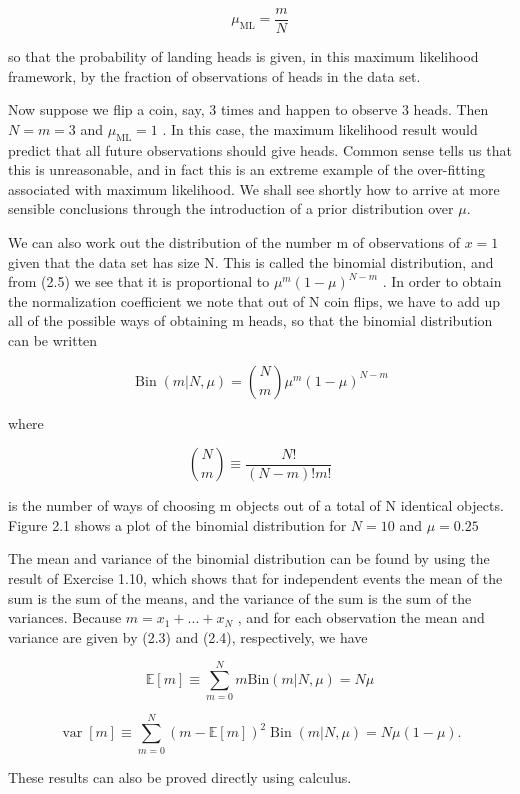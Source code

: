 \documentclass[
  10
]{article}
\begin{document}
\[
\mu_ {\mathrm{ML}} = \frac {m}{N}\tag{2.8}
\]

so that the probability of landing heads is given, in this maximum
likelihood framework, by the fraction of observations of heads in the
data set.

Now suppose we flip a coin, say, 3 times and happen to observe 3 heads.
Then \(N = m = 3\) and \(\mu _ { \mathrm { M L } } = 1\) . In this case,
the maximum likelihood result would predict that all future observations
should give heads. Common sense tells us that this is unreasonable, and
in fact this is an extreme example of the over-fitting associated with
maximum likelihood. We shall see shortly how to arrive at more sensible
conclusions through the introduction of a prior distribution over
\(\mu .\)

We can also work out the distribution of the number m of observations of
\(x = 1\) given that the data set has size N. This is called the
binomial distribution, and from (2.5) we see that it is proportional to
\(\mu ^ { m } ( 1 - \mu ) ^ { N - m }\) . In order to obtain the
normalization coefficient we note that out of N coin flips, we have to
add up all of the possible ways of obtaining m heads, so that the
binomial distribution can be written

\[
\operatorname{Bin} (m | N, \mu) = \binom {N} {m} \mu^ {m} (1 - \mu) ^ {N - m}\tag{2.9}
\]

where

\[
\binom {N} {m} \equiv \frac {N !}{(N - m) ! m !}\tag{2.10}
\]

is the number of ways of choosing m objects out of a total of N
identical objects. Figure 2.1 shows a plot of the binomial distribution
for \(N = 1 0\) and \(\mu = 0 . 2 5\)

The mean and variance of the binomial distribution can be found by using
the result of Exercise 1.10, which shows that for independent events the
mean of the sum is the sum of the means, and the variance of the sum is
the sum of the variances. Because \(m = x _ { 1 } + . . . + x _ { N }\)
, and for each observation the mean and variance are given by (2.3) and
(2.4), respectively, we have

\[
\mathbb {E} [ m ] \equiv \sum_ {m = 0} ^ {N} m \mathrm{Bin} (m | N, \mu) = N \mu\tag{2.11}
\]

\[
\operatorname{var} [ m ] \equiv \sum_ {m = 0} ^ {N} (m - \mathbb {E} [ m ]) ^ {2} \operatorname{Bin} (m | N, \mu) = N \mu (1 - \mu).\tag{2.12}
\]

These results can also be proved directly using calculus.
\end{document}
